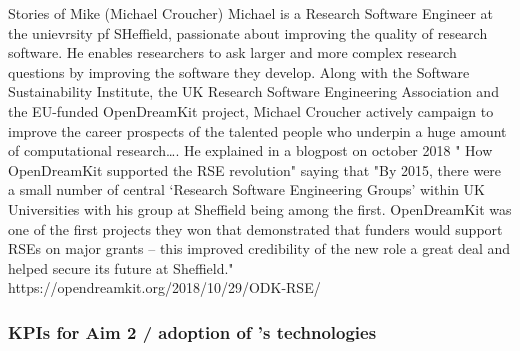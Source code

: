 \begin{Aim 1}
             Stories of Mike (Michael Croucher)
Michael is a Research Software Engineer at the unievrsity pf SHeffield, passionate about improving the quality of research
software. He enables researchers to ask larger and more complex research questions by improving the software they develop. Along with the 
Software Sustainability Institute, the UK Research Software Engineering Association and the EU-funded OpenDreamKit project, Michael Croucher 
actively campaign to improve the career prospects of the talented people who underpin a huge amount of computational research…. He explained 
in a blogpost on october 2018 " How OpenDreamKit supported the RSE revolution" saying that "By 2015, there were a small number of central 
‘Research Software Engineering Groups’ within UK Universities with his group at Sheffield  being among the first. OpenDreamKit was one of 
the first projects they won that demonstrated that funders would support RSEs on major grants – this improved credibility of the new role a 
great deal and helped secure its future at Sheffield."%
 https://opendreamkit.org/2018/10/29/ODK-RSE/
                              

\subsubsection{KPIs for Aim 2 / adoption of \ODK's technologies}

\end{Aim 1}
